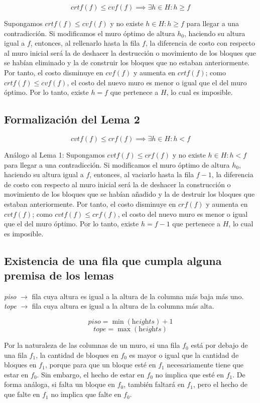 \documentclass[a4paper,12pt]{article}
\begin{document}
\[
crtf(f) \leq cvf(f) \implies \exists h \in H: h \geq f
\]

Supongamos $crtf(f) \leq cvf(f)$ y no existe $h \in H: h \geq f$ para llegar a una contradicción. Si modificamos el muro óptimo de altura $h_0$, haciendo su altura igual a $f$, entonces, al rellenarlo hasta la fila $f$, la diferencia de costo con respecto al muro inicial será la de deshacer la destrucción o movimiento de los bloques que se habían eliminado y la de construir los bloques que no estaban anteriormente. Por tanto, el costo disminuye en $cvf(f)$ y aumenta en $crtf(f)$; como $crtf(f) \leq cvf(f)$, el costo del nuevo muro es menor o igual que el del muro óptimo. Por lo tanto, existe $h = f$ que pertenece a $H$, lo cual es imposible.

\subsection{Formalización del Lema 2}

\[
cvtf(f) \leq crf(f) \implies \exists h \in H: h < f
\]

Análogo al Lema 1: Supongamos $cvtf(f) \leq crf(f)$ y no existe $h \in H: h < f$ para llegar a una contradicción. Si modificamos el muro óptimo de altura $h_0$, haciendo su altura igual a $f$, entonces, al vaciarlo hasta la fila $f-1$, la diferencia de costo con respecto al muro inicial será la de deshacer la construcción o movimiento de los bloques que se habían añadido y la de destruir los bloques que estaban anteriormente. Por tanto, el costo disminuye en $crf(f)$ y aumenta en $cvtf(f)$; como $cvtf(f) \leq crf(f)$, el costo del nuevo muro es menor o igual que el del muro óptimo. Por lo tanto, existe $h = f-1$ que pertenece a $H$, lo cual es imposible.

\subsection{Existencia de una fila que cumpla alguna premisa de los lemas}

\textit{piso} $\rightarrow$ fila cuya altura es igual a la altura de la columna más baja más uno.\\
\textit{tope} $\rightarrow$ fila cuya altura es igual a la altura de la columna más alta.

\[
piso = \min(\textit{heights}) + 1
\]
\[
tope = \max(\textit{heights})
\]

Por la naturaleza de las columnas de un muro, si una fila $f_0$ está por debajo de una fila $f_1$, la cantidad de bloques en $f_0$ es mayor o igual que la cantidad de bloques en $f_1$, porque para que un bloque esté en $f_1$ necesariamente tiene que estar en $f_0$. Sin embargo, el hecho de estar en $f_0$ no implica que esté en $f_1$. De forma análoga, si falta un bloque en $f_0$, también faltará en $f_1$, pero el hecho de que falte en $f_1$ no implica que falte en $f_0$.
\end{document}
